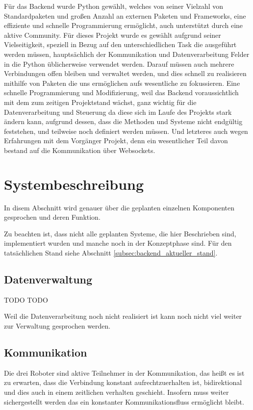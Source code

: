 Für das Backend wurde Python gewählt, 
welches von seiner Vielzahl von Standardpaketen und 
großen Anzahl an externen Paketen und Frameworks, 
eine effiziente und schnelle Programmierung ermöglicht, 
auch unterstützt durch eine aktive Community.
% 
Für dieses Projekt wurde es gewählt aufgrund seiner Vielseitigkeit, 
speziell in Bezug auf den unterschiedlichen Task die ausgeführt werden müssen, 
hauptsächlich der Kommunikation und Datenverarbeitung 
Felder in die Python üblicherweise verwendet werden.
% 
Darauf müssen auch mehrere Verbindungen offen bleiben und verwaltet werden,
und dies schnell zu realisieren mithilfe von Paketen 
die uns ermöglichen aufs wesentliche zu fokussieren.
% 
Eine schnelle Programmierung und Modifizierung, 
weil das Backend voraussichtlich mit dem zum zeitigen Projektstand wächst, 
ganz wichtig für die Datenverarbeitung und Steuerung 
da diese sich im Laufe des Projekts stark ändern kann,
aufgrund dessen, dass die Methoden und Systeme nicht endgültig feststehen, 
und teilweise noch definiert werden müssen.
% 
Und letzteres auch wegen Erfahrungen mit dem Vorgänger Projekt, 
denn ein wesentlicher Teil davon bestand auf die Kommunikation über Websockets.
\section{Systembeschreibung}
In disem Abschnitt wird genauer 
über die geplanten einzelnen Komponenten gesprochen 
und deren Funktion.

Zu beachten ist, dass nicht alle geplanten Systeme, die hier Beschrieben sind,
implementiert wurden und manche noch in der Konzeptphase sind.
Für den tatsächlichen Stand siehe Abschnitt \ref{subsec:backend_aktueller_stand}.

\subsection{Datenverwaltung}
\label{subsec:backend_data}
TODO
TODO

Weil die Datenverarbeitung noch nicht realisiert ist 
kann noch nicht viel weiter zur Verwaltung gesprochen werden.

\subsection{Kommunikation}
\label{subsec:Kommunikation}
Die drei Roboter sind aktive Teilnehmer in der Kommunikation, 
das heißt es ist zu erwarten, dass die Verbindung konstant aufrechtzuerhalten ist,
bidirektional und dies auch in einem zeitlichen verhalten geschieht. 
Insofern muss weiter sichergestellt werden das ein konstanter Kommunikationsfluss 
ermöglicht bleibt.


